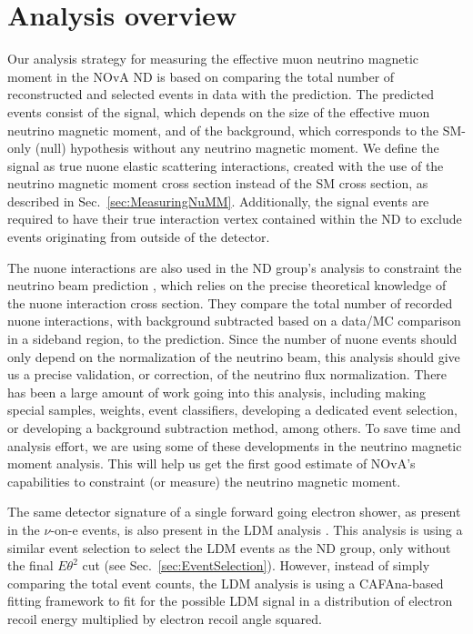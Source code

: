 \section{Analysis overview}\label{sec:AnalysisOverview}
Our analysis strategy for measuring the effective muon neutrino magnetic moment in the \gls{NOvA} \gls{ND} is based on comparing the total number of reconstructed and selected events in data with the prediction.  The predicted events consist of the signal, which depends on the size of the effective muon neutrino magnetic moment, and of the background, which corresponds to the \gls{SM}-only (null) hypothesis without any neutrino magnetic moment. We define the signal as true \gls{nuone} elastic scattering interactions, created with the use of the neutrino magnetic moment cross section instead of the \gls{SM} cross section, as described in Sec.~\ref{sec:MeasuringNuMM}. Additionally, the signal events are required to have their true interaction vertex contained within the \gls{ND} to exclude events originating from outside of the detector.

The \gls{nuone} interactions are also used in the \gls{ND} group's analysis to constraint the neutrino beam prediction \cite{NOVA-doc-56383}, which relies on the precise theoretical knowledge of the \gls{nuone} interaction cross section. They compare the total number of recorded \gls{nuone} interactions, with background subtracted based on a data/\gls{MC} comparison in a sideband region, to the prediction. Since the number of \gls{nuone} events should only depend on the normalization of the neutrino beam, this analysis should give us a precise validation, or correction, of the neutrino flux normalization. There has been a large amount of work going into this analysis, including making special samples, weights, event classifiers, developing a dedicated event selection, or developing a background subtraction method, among others. To save time and analysis effort, we are using some of these developments in the neutrino magnetic moment analysis. This will help us get the first good estimate of \gls{NOvA}'s capabilities to constraint (or measure) the neutrino magnetic moment.

The same detector signature of a single forward going electron shower, as present in the $\nu$-on-e events, is also present in the \gls{LDM} analysis \cite{NOVA-doc-59439}. This analysis is using a similar event selection to select the \gls{LDM} events as the \gls{ND} group, only without the final $E\theta^2$ cut (see Sec.~\ref{sec:EventSelection}). However, instead of simply comparing the total event counts, the \gls{LDM} analysis is using a CAFAna-based fitting framework to fit for the possible \gls{LDM} signal in a distribution of electron recoil energy multiplied by electron recoil angle squared.

